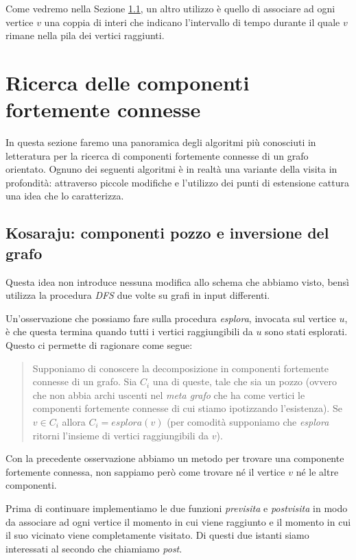 Come vedremo nella Sezione \ref{subsection:kosaraju-algorithm}, un
altro utilizzo \`e quello di associare ad ogni vertice $v$ una coppia
di interi che indicano l'intervallo di tempo durante il quale $v$
rimane nella pila dei vertici raggiunti.

\section{Ricerca delle componenti fortemente connesse}

In questa sezione faremo una panoramica degli algoritmi pi\`u
conosciuti in letteratura per la ricerca di componenti fortemente
connesse di un grafo orientato. Ognuno dei seguenti algoritmi \`e in
realt\`a una variante della visita in profondit\`a: attraverso piccole
modifiche e l'utilizzo dei punti di estensione cattura una idea che lo
caratterizza.

\subsection{Kosaraju: componenti pozzo e inversione del grafo}
\label{subsection:kosaraju-algorithm}
Questa idea non introduce nessuna modifica allo schema che abbiamo
visto, bens\`i utilizza la procedura \emph{DFS} due volte su grafi in
input differenti.

Un'osservazione che possiamo fare sulla procedura \emph{esplora},
invocata sul vertice $u$, \`e che questa termina quando tutti i
vertici raggiungibili da $u$ sono stati esplorati. Questo ci permette
di ragionare come segue:
\begin{quotation}
  Supponiamo di conoscere la decomposizione in componenti fortemente
  connesse di un grafo. Sia $C_{i}$ una di queste, tale che sia un
  pozzo (ovvero che non abbia archi uscenti nel \emph{meta grafo} che
  ha come vertici le componenti fortemente connesse di cui stiamo
  ipotizzando l'esistenza). Se $v \in C_{i}$ allora $C_{i} =
  esplora(v)$ (per comodit\`a supponiamo che \emph{esplora} ritorni
  l'insieme di vertici raggiungibili da $v$).
\end{quotation}

Con la precedente osservazione abbiamo un metodo per trovare una
componente fortemente connessa, non sappiamo per\`o come trovare n\'e il
vertice $v$ n\'e le altre componenti.

Prima di continuare implementiamo le due funzioni \emph{previsita} e
\emph{postvisita} in modo da associare ad ogni vertice il momento in
cui viene raggiunto e il momento in cui il suo vicinato viene
completamente visitato. Di questi due istanti siamo interessati al
secondo che chiamiamo \emph{post}.

